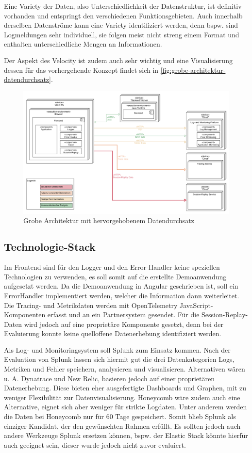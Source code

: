 Eine Variety der Daten, also Unterschiedlichkeit der Datenstruktur, ist definitiv vorhanden und entspringt den verschiedenen Funktionsgebieten. Auch innerhalb derselben Datenströme kann eine Variety identifiziert werden, denn bspw. sind Logmeldungen sehr individuell, sie folgen meist nicht streng einem Format und enthalten unterschiedliche Mengen an Informationen.

Der Aspekt des Velocity ist zudem auch sehr wichtig und eine Visualisierung dessen für das vorhergehende Konzept findet sich in \autoref{fig:grobe-architektur-datendurchsatz}.
	
\begin{figure}[H]
	\centering
	\includegraphics[width=0.75\linewidth]{img/04_erstellung-poc/konzept-datendurchsatz.png}
	\caption{Grobe Architektur mit hervorgehobenem Datendurchsatz}
	\label{fig:grobe-architektur-datendurchsatz}
\end{figure}

\pagebreak

	\subsection{Technologie-Stack}
	\label{sec:technologie-stack}

	Im Frontend sind für den Logger und den Error-Handler keine speziellen Technologien zu verwenden, es soll somit auf die erstellte Demoanwendung aufgesetzt werden. Da die Demoanwendung in Angular geschrieben ist, soll ein ErrorHandler implementiert werden, welcher die Information dann weiterleitet. Die Tracing- und Metrikdaten werden mit OpenTelemetry JavaScript-Komponenten erfasst und an ein Partnersystem gesendet. Für die Session-Replay-Daten wird jedoch auf eine proprietäre Komponente gesetzt, denn bei der Evaluierung konnte keine quelloffene Datenerhebung identifiziert werden.
	
	Als Log- und Monitoringsystem soll Splunk zum Einsatz kommen. Nach der Evaluation von Splunk lassen sich hiermit gut die drei Datenkategorien Logs, Metriken und Fehler speichern, analysieren und visualisieren. Alternativen wären u. A. Dynatrace und New Relic, basieren jedoch auf einer proprietären Datenerhebung. Diese bieten eher ausgefertigte Dashboards und Graphen, mit zu weniger Flexibilität zur Datenvisualisierung. Honeycomb wäre zudem auch eine Alternative, eignet sich aber weniger für strikte Logdaten. Unter anderem werden die Daten bei Honeycomb nur für 60 Tage gespeichert. Somit blieb Splunk als einziger Kandidat, der den gewünschten Rahmen erfüllt. Es sollten jedoch auch andere Werkzeuge Splunk ersetzen können, bspw. der Elastic Stack könnte hierfür auch geeignet sein, dieser wurde jedoch nicht zuvor evaluiert.
	

